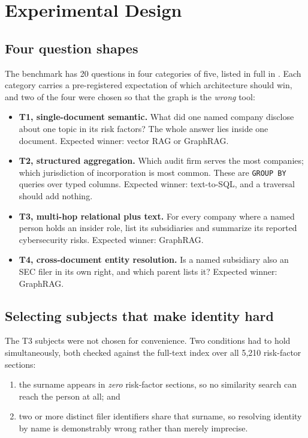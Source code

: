 \section{Experimental Design}
\label{sec:design}

\subsection{Four question shapes}

The benchmark has 20 questions in four categories of five, listed in full in
. Each category carries a pre-registered expectation of which
architecture should win, and two of the four were chosen so that the graph is the
\emph{wrong} tool:

\begin{itemize}
  \item \textbf{T1, single-document semantic.} What did one named company disclose
        about one topic in its risk factors? The whole answer lies inside one
        document. Expected winner: vector RAG or GraphRAG.
  \item \textbf{T2, structured aggregation.} Which audit firm serves the most
        companies; which jurisdiction of incorporation is most common. These are
        \texttt{GROUP BY} queries over typed columns. Expected winner:
        text-to-SQL, and a traversal should add nothing.
  \item \textbf{T3, multi-hop relational plus text.} For every company where a
        named person holds an insider role, list its subsidiaries and summarize
        its reported cybersecurity risks. Expected winner: GraphRAG.
  \item \textbf{T4, cross-document entity resolution.} Is a named subsidiary also
        an SEC filer in its own right, and which parent lists it? Expected
        winner: GraphRAG.
\end{itemize}

\subsection{Selecting subjects that make identity hard}

The T3 subjects were not chosen for convenience. Two conditions had to hold
simultaneously, both checked against the full-text index over all 5{,}210
risk-factor sections:

\begin{enumerate}
  \item the surname appears in \emph{zero} risk-factor sections, so no similarity
        search can reach the person at all; and
  \item two or more distinct filer identifiers share that surname, so resolving
        identity by name is demonstrably wrong rather than merely imprecise.
\end{enumerate}

